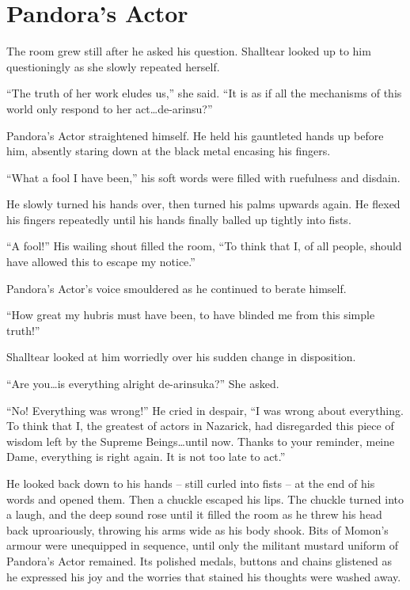\chapter{Pandora's Actor}

The room grew still after he asked his question. Shalltear looked up to him questioningly as she slowly repeated herself.

 

“The truth of her work eludes us,” she said. “It is as if all the mechanisms of this world only respond to her act…de-arinsu?”

 

Pandora’s Actor straightened himself. He held his gauntleted hands up before him, absently staring down at the black metal encasing his fingers.

 

“What a fool I have been,” his soft words were filled with ruefulness and disdain.

 

He slowly turned his hands over, then turned his palms upwards again. He flexed his fingers repeatedly until his hands finally balled up tightly into fists.

 

“A fool!” His wailing shout filled the room, “To think that I, of all people, should have allowed this to escape my notice.”

 

Pandora’s Actor’s voice smouldered as he continued to berate himself.

 

“How great my hubris must have been, to have blinded me from this simple truth!”

 

Shalltear looked at him worriedly over his sudden change in disposition.

 

“Are you…is everything alright de-arinsuka?” She asked.

 

“No! Everything was wrong!” He cried in despair, “I was wrong about everything. To think that I, the greatest of actors in Nazarick, had disregarded this piece of wisdom left by the Supreme Beings…until now. Thanks to your reminder, meine Dame, everything is right again. It is not too late to act.”

 

He looked back down to his hands – still curled into fists – at the end of his words and opened them. Then a chuckle escaped his lips. The chuckle turned into a laugh, and the deep sound rose until it filled the room as he threw his head back uproariously, throwing his arms wide as his body shook. Bits of Momon’s armour were unequipped in sequence, until only the militant mustard uniform of Pandora’s Actor remained. Its polished medals, buttons and chains glistened as he expressed his joy and the worries that stained his thoughts were washed away.

